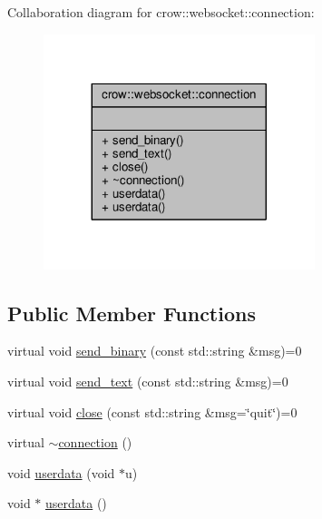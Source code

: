 Collaboration diagram for crow\-:\-:websocket\-:\-:connection\-:
\nopagebreak
\begin{figure}[H]
\begin{center}
\leavevmode
\includegraphics[width=224pt]{structcrow_1_1websocket_1_1connection__coll__graph}
\end{center}
\end{figure}
\subsection*{Public Member Functions}
\begin{DoxyCompactItemize}
\item 
virtual void \hyperlink{structcrow_1_1websocket_1_1connection_a508f3f8dcb0ce467c82d383317c35dae}{send\-\_\-binary} (const std\-::string \&msg)=0
\item 
virtual void \hyperlink{structcrow_1_1websocket_1_1connection_a6328a5e17af38a367e4f1c9e904900bc}{send\-\_\-text} (const std\-::string \&msg)=0
\item 
virtual void \hyperlink{structcrow_1_1websocket_1_1connection_a0166bd544dfe0e24343328838a556e07}{close} (const std\-::string \&msg=\char`\"{}quit\char`\"{})=0
\item 
virtual \hyperlink{structcrow_1_1websocket_1_1connection_a138eb577cfd1405f91d710dae9309e8c}{$\sim$connection} ()
\item 
void \hyperlink{structcrow_1_1websocket_1_1connection_a75b25cfa1f5f8fd3bbae01b5637097f6}{userdata} (void $\ast$u)
\item 
void $\ast$ \hyperlink{structcrow_1_1websocket_1_1connection_a301af57187b6d7419d1825c8a15c22f6}{userdata} ()
\end{DoxyCompactItemize}


